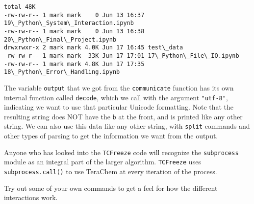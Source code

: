     \begin{Verbatim}[commandchars=\\\{\}]
total 48K
-rw-rw-r-- 1 mark mark    0 Jun 13 16:37 19\_Python\_System\_Interaction.ipynb
-rw-rw-r-- 1 mark mark    0 Jun 13 16:38 20\_Python\_Final\_Project.ipynb
drwxrwxr-x 2 mark mark 4.0K Jun 17 16:45 test\_data
-rw-rw-r-- 1 mark mark  33K Jun 17 17:01 17\_Python\_File\_IO.ipynb
-rw-rw-r-- 1 mark mark 4.8K Jun 17 17:35 18\_Python\_Error\_Handling.ipynb

    \end{Verbatim}

    The variable \texttt{output} that we got from the \texttt{communicate}
function has its own internal function called \texttt{decode}, which we
call with the argument \texttt{"utf-8"}, indicating we want to use that
particular Unicode formatting. Note that the resulting string does NOT
have the \texttt{b} at the front, and is printed like any other string.
We can also use this data like any other string, with \texttt{split}
commands and other types of parsing to get the information we want from
the output.

Anyone who has looked into the \texttt{TCFreeze} code will recognize the
\texttt{subprocess} module as an integral part of the larger algorithm.
\texttt{TCFreeze} uses \texttt{subprocess.call()} to use TeraChem at
every iteration of the process.

Try out some of your own commands to get a feel for how the different
interactions work.
